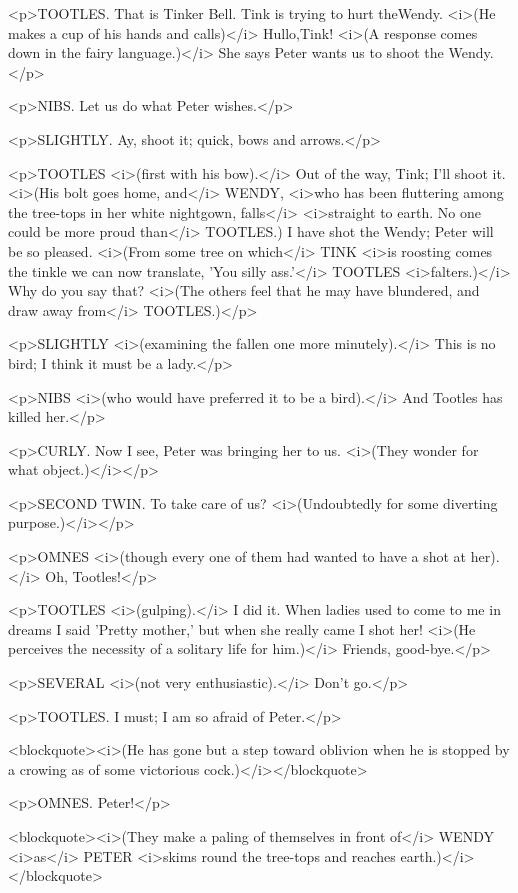 <p>TOOTLES. That is Tinker Bell. Tink is trying to hurt theWendy. <i>(He makes a cup of his hands and calls)</i> Hullo,Tink! <i>(A response comes down in the fairy language.)</i> She says Peter wants us to shoot the Wendy.</p>

<p>NIBS. Let us do what Peter wishes.</p>

<p>SLIGHTLY. Ay, shoot it; quick, bows and arrows.</p>

<p>TOOTLES <i>(first with his bow).</i> Out of the way, Tink; I'll shoot it. <i>(His bolt goes home, and</i> WENDY, <i>who has been fluttering among the tree-tops in her white nightgown, falls</i> <i>straight to earth. No one could be more proud than</i> TOOTLES.) I have shot the Wendy; Peter will be so pleased. <i>(From some tree on which</i> TINK <i>is roosting comes the tinkle we can now translate, 'You silly ass.'</i> TOOTLES <i>falters.)</i> Why do you say that? <i>(The others feel that he may have blundered, and draw away from</i> TOOTLES.)</p>

<p>SLIGHTLY <i>(examining the fallen one more minutely).</i> This is no bird; I think it must be a lady.</p>

<p>NIBS <i>(who would have preferred it to be a bird).</i> And Tootles has killed her.</p>

<p>CURLY. Now I see, Peter was bringing her to us. <i>(They wonder for what object.)</i></p>

<p>SECOND TWIN. To take care of us? <i>(Undoubtedly for some diverting purpose.)</i></p>

<p>OMNES <i>(though every one of them had wanted to have a shot at her).</i> Oh, Tootles!</p>

<p>TOOTLES <i>(gulping).</i> I did it. When ladies used to come to me in dreams I said 'Pretty mother,' but when she really came I shot her! <i>(He perceives the necessity of a solitary life for him.)</i> Friends, good-bye.</p>

<p>SEVERAL <i>(not very enthusiastic).</i> Don't go.</p>

<p>TOOTLES. I must; I am so afraid of Peter.</p>

<blockquote><i>(He has gone but a step toward oblivion when he is stopped by a crowing as of some victorious cock.)</i></blockquote>

<p>OMNES. Peter!</p>

<blockquote><i>(They make a paling of themselves in front of</i> WENDY <i>as</i> PETER <i>skims round the tree-tops and reaches earth.)</i></blockquote>

